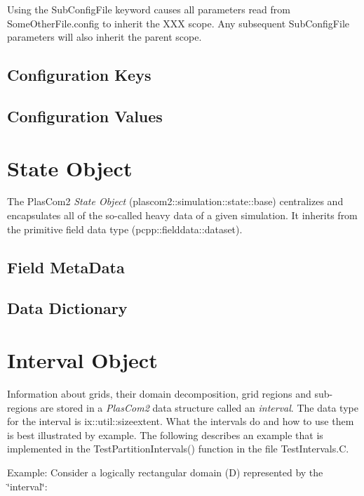 Using the Sub\+Config\+File keyword causes all parameters read from Some\+Other\+File.\+config to inherit the X\+XX scope. Any subsequent Sub\+Config\+File parameters will also inherit the parent scope.\hypertarget{developer_reference_configkey}{}\subsection{Configuration Keys}\label{developer_reference_configkey}
\hypertarget{developer_reference_configvalue}{}\subsection{Configuration Values}\label{developer_reference_configvalue}
\hypertarget{developer_reference_state}{}\section{State Object}\label{developer_reference_state}
The Plas\+Com2 {\itshape State Object} (plascom2\+::simulation\+::state\+::base) centralizes and encapsulates all of the so-\/called heavy data of a given simulation. It inherits from the primitive field data type (pcpp\+::fielddata\+::dataset).\hypertarget{developer_reference_metadata}{}\subsection{Field Meta\+Data}\label{developer_reference_metadata}
\hypertarget{developer_reference_dictionary}{}\subsection{Data Dictionary}\label{developer_reference_dictionary}
\hypertarget{developer_reference_interval}{}\section{Interval Object}\label{developer_reference_interval}
Information about grids, their domain decomposition, grid regions and sub-\/regions are stored in a {\itshape Plas\+Com2} data structure called an {\itshape interval}. The data type for the interval is ix\+::util\+::sizeextent. What the intervals do and how to use them is best illustrated by example. The following describes an example that is implemented in the Test\+Partition\+Intervals() function in the file Test\+Intervals.\+C.

Example\+: Consider a logically rectangular domain (D) represented by the \char`\"{}interval\char`\"{}\+:

